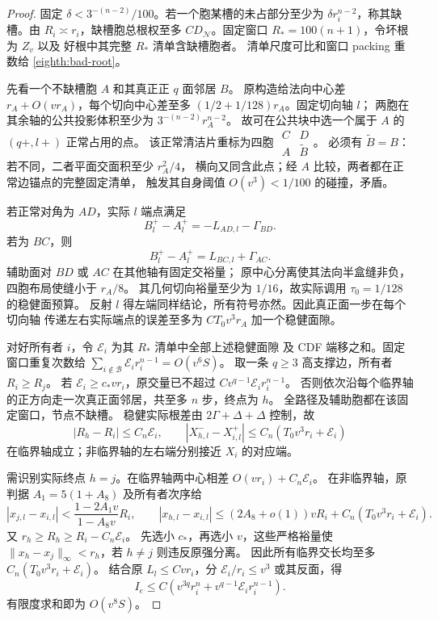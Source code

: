 \begin{proof}
固定 \(\delta<3^{-(n-2)}/100\)。若一个胞某槽的未占部分至少为
\(\delta r_i^{n-2}\)，称其缺槽。由 \(R_i\asymp r_i\)，缺槽胞总根权至多
\(CD_{\mathcal N}\)。固定窗口 \(R_*=100(n+1)\)，令坏根为 \(Z_v\) 以及
好根中其完整 \(R_*\) 清单含缺槽胞者。
清单尺度可比和窗口 packing 重数给 \eqref{eighth:bad-root}。

先看一个不缺槽胞 \(A\) 和其真正正 \(q\) 面邻居 \(B\)。
原构造给法向中心差 \(r_A+O(vr_A)\)，每个切向中心差至多
\((1/2+1/128)r_A\)。固定切向轴 \(l\)；
两胞在其余轴的公共投影体积至少为 \(3^{-(n-2)}r_A^{n-2}\)。
故可在公共块中选一个属于 \(A\) 的 \((q+,l+)\) 正常占用的点。
该正常清洁片重标为四胞
\(\begin{smallmatrix}C&D\\ A&\widetilde B\end{smallmatrix}\)。
必须有 \(\widetilde B=B\)：若不同，二者平面交面积至少 \(r_A^2/4\)，
横向又同含此点；经 \(A\) 比较，两者都在正常边锚点的完整固定清单，
触发其自身阈值 \(O(v^3)<1/100\) 的碰撞，矛盾。

若正常对角为 \(AD\)，实际 \(l\) 端点满足
\[
 B_l^+-A_l^+=-L_{AD,l}-\Gamma_{BD}.
\]
若为 \(BC\)，则
\[
 B_l^+-A_l^+=L_{BC,l}+\Gamma_{AC}.
\]
辅助面对 \(BD\) 或 \(AC\) 在其他轴有固定交裕量；
原中心分离使其法向半盒缝非负，四胞布局使缝小于 \(r_A/8\)。
其几何切向裕量至少为 \(1/16\)，故实际调用 \(\tau_0=1/128\) 的稳健面预算。
反射 \(l\) 得左端同样结论，所有符号亦然。因此真正面一步在每个切向轴
传递左右实际端点的误差至多为 \(C T_0v^3r_A\) 加一个稳健面隙。

对好所有者 \(i\)，令 \(\mathcal E_i\) 为其 \(R_*\) 清单中全部上述稳健面隙
及 CDF 端移之和。固定窗口重复次数给
\(\sum_{i\notin\mathcal B}\mathcal E_ir_i^{n-1}=O(v^6S)\)。
取一条 \(q\ge3\) 高支撑边，所有者 \(R_i\ge R_j\)。
若 \(\mathcal E_i\ge c_*vr_i\)，原交量已不超过
\(Cv^{q-1}\mathcal E_ir_i^{n-1}\)。
否则依次沿每个临界轴的正方向走一次真正面邻居，共至多 \(n\) 步，终点为 \(h\)。
全路径及辅助胞都在该固定窗口，节点不缺槽。
稳健实际根差由 \(2\Gamma+\Delta+\Delta\) 控制，故
\[
 |R_h-R_i|\le C_n\mathcal E_i,\qquad
 |X_{h,l}^--X_{i,l}^+|\le C_n(T_0v^3r_i+\mathcal E_i)
\]
在临界轴成立；非临界轴的左右端分别接近 \(X_i\) 的对应端。

需识别实际终点 \(h=j\)。在临界轴两中心相差 \(O(vr_i)+C_n\mathcal E_i\)。
在非临界轴，原判据 \(A_1=5(1+A_8)\) 及所有者次序给
\[
 |x_{j,l}-x_{i,l}|<
 \frac{1-2A_1v}{1-A_8v}R_i,\qquad
 |x_{h,l}-x_{i,l}|
 \le(2A_8+o(1))vR_i+C_n(T_0v^3r_i+\mathcal E_i).
\]
又 \(r_h\ge R_h\ge R_i-C_n\mathcal E_i\)。
先选小 \(c_*\)，再选小 \(v\)，这些严格裕量使
\(\|x_h-x_j\|_\infty<r_h\)，若 \(h\ne j\) 则违反原强分离。
因此所有临界交长均至多 \(C_n(T_0v^3r_i+\mathcal E_i)\)。
结合原 \(L_l\le C v r_i\)，分 \(\mathcal E_i/r_i\le v^3\) 或其反面，得
\[
 I_e\le C(v^{3q}r_i^n+v^{q-1}\mathcal E_ir_i^{n-1}).
\]
有限度求和即为 \(O(v^8S)\)。
\end{proof}

